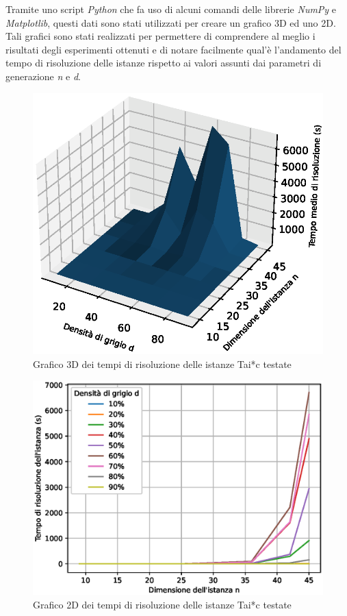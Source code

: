 \newpage \noindent
Tramite uno script \textit{Python} che fa uso di alcuni comandi delle librerie \textit{NumPy} e \textit{Matplotlib}, questi dati 
sono stati utilizzati per creare un grafico 3D ed uno 2D. Tali grafici sono stati realizzati per permettere di comprendere al meglio i risultati 
degli esperimenti ottenuti e di notare facilmente qual'è l'andamento del tempo di risoluzione delle istanze rispetto ai valori assunti dai 
parametri di generazione \textit{n} e \textit{d}.
\begin{figure}[h!]
    \centering
    \includegraphics[scale=0.9]{images/resolution_times.eps}
    \caption{Grafico 3D dei tempi di risoluzione delle istanze Tai*c testate}
    \label{fig:times}
\end{figure}
\begin{figure}[h!]
    \centering
    \includegraphics[scale=0.59]{images/resolution_times2.eps}
    \caption{Grafico 2D dei tempi di risoluzione delle istanze Tai*c testate}
    \label{fig:times2}
\end{figure}

